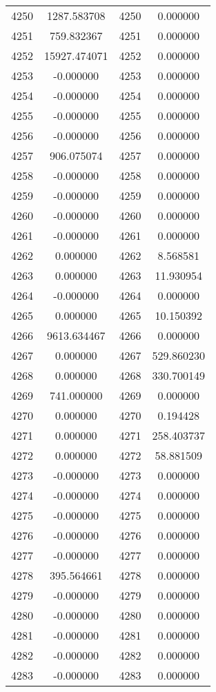 \documentclass[12pt]{article}
\begin{document}
\begin{longtable}{@{}cccc@{}}
4250 & 1287.583708 & 4250 & 0.000000 \\
4251 & 759.832367 & 4251 & 0.000000 \\
4252 & 15927.474071 & 4252 & 0.000000 \\
4253 & -0.000000 & 4253 & 0.000000 \\
4254 & -0.000000 & 4254 & 0.000000 \\
4255 & -0.000000 & 4255 & 0.000000 \\
4256 & -0.000000 & 4256 & 0.000000 \\
4257 & 906.075074 & 4257 & 0.000000 \\
4258 & -0.000000 & 4258 & 0.000000 \\
4259 & -0.000000 & 4259 & 0.000000 \\
4260 & -0.000000 & 4260 & 0.000000 \\
4261 & -0.000000 & 4261 & 0.000000 \\
4262 & 0.000000 & 4262 & 8.568581 \\
4263 & 0.000000 & 4263 & 11.930954 \\
4264 & -0.000000 & 4264 & 0.000000 \\
4265 & 0.000000 & 4265 & 10.150392 \\
4266 & 9613.634467 & 4266 & 0.000000 \\
4267 & 0.000000 & 4267 & 529.860230 \\
4268 & 0.000000 & 4268 & 330.700149 \\
4269 & 741.000000 & 4269 & 0.000000 \\
4270 & 0.000000 & 4270 & 0.194428 \\
4271 & 0.000000 & 4271 & 258.403737 \\
4272 & 0.000000 & 4272 & 58.881509 \\
4273 & -0.000000 & 4273 & 0.000000 \\
4274 & -0.000000 & 4274 & 0.000000 \\
4275 & -0.000000 & 4275 & 0.000000 \\
4276 & -0.000000 & 4276 & 0.000000 \\
4277 & -0.000000 & 4277 & 0.000000 \\
4278 & 395.564661 & 4278 & 0.000000 \\
4279 & -0.000000 & 4279 & 0.000000 \\
4280 & -0.000000 & 4280 & 0.000000 \\
4281 & -0.000000 & 4281 & 0.000000 \\
4282 & -0.000000 & 4282 & 0.000000 \\
4283 & -0.000000 & 4283 & 0.000000 \\

\end{longtable}
\end{document}
